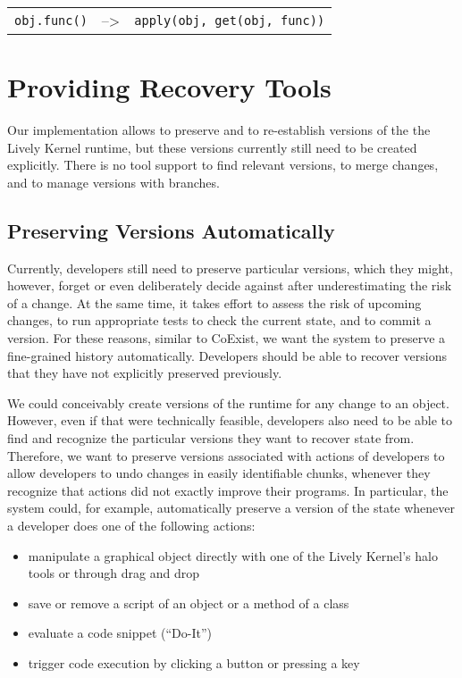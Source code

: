 \begin{center}
    \begin{tabular}{ lll }
    \lstinline|obj.func()| & --> & \lstinline|apply(obj, get(obj, func))| \\
    \end{tabular}
\end{center}



\section{Providing Recovery Tools}

Our implementation allows to preserve and to re-establish versions of the the Lively Kernel runtime, but these versions currently still need to be created explicitly.
There is no tool support to find relevant versions, to merge changes, and to manage versions with branches.


\subsection{Preserving Versions Automatically}

Currently, developers still need to preserve particular versions, which they might, however, forget or even deliberately decide against after underestimating the risk of a change.
At the same time, it takes effort to assess the risk of upcoming changes, to run appropriate tests to check the current state, and to commit a version.
For these reasons, similar to CoExist, we want the system to preserve a fine-grained history automatically.
Developers should be able to recover versions that they have not explicitly preserved previously.

We could conceivably create versions of the runtime for any change to an object.
However, even if that were technically feasible, developers also need to be able to find and recognize the particular versions they want to recover state from.
Therefore, we want to preserve versions associated with actions of developers to allow developers to undo changes in easily identifiable chunks, whenever they recognize that actions did not exactly improve their programs.
In particular, the system could, for example, automatically preserve a version of the state whenever a developer does one of the following actions:
\begin{itemize}
    \item manipulate a graphical object directly with one of the Lively Kernel's halo tools or through drag and drop
    \item save or remove a script of an object or a method of a class
    \item evaluate a code snippet (``Do-It'')
    \item trigger code execution by clicking a button or pressing a key
\end{itemize}


